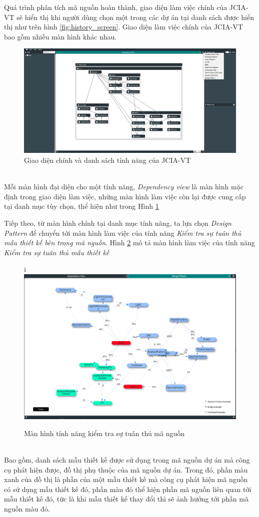 \documentclass[12pt]{report}
\begin{document}
Quá trình phân tích mã nguồn hoàn thành, giao diện làm việc chính của JCIA-VT sẽ hiển thị khi người dùng chọn một trong các dự án tại danh sách được hiển thị như trên hình \ref{fig:history_screen}. Giao diện làm việc chính của JCIA-VT bao gồm nhiều màn hình khác nhau.
\begin{figure}[h]
	\centering
	\includegraphics[scale=0.25]{images/main_screen}
	\caption{Giao diện chính và danh sách tính năng của JCIA-VT}
	\label{fig:main_screen}
\end{figure}\\
Mỗi màn hình đại diện cho một tính năng, \textit{Dependency view} là màn hình mặc định trong giao diện làm việc, những màn hình làm việc còn lại được cung cấp tại danh mục tùy chọn, thể hiện như trong Hình \ref{fig:main_screen}

\noindent Tiếp theo, từ màn hình chính tại danh mục tính năng, ta lựa chọn \textit{Design Pattern} để chuyển tới màn hình làm việc của tính năng \textit{Kiểm tra sự tuân thủ mẫu thiết kế bên trong mã nguồn}. Hình \ref{fig:design_pattern_workspace} mô tả màn hình làm việc của tính năng \textit{Kiểm tra sự tuân thủ mẫu thiết kế}
\begin{figure}[h]i
	\centering
	\includegraphics[scale=0.34]{images/design_pattern_workspace}
	\caption{Màn hình tính năng kiểm tra sự tuân thủ mã nguồn}
	\label{fig:design_pattern_workspace}
\end{figure}\\
Bao gồm, danh sách mẫu thiết kế được sử dụng trong mã nguồn dự án mà công cụ phát hiện được, đồ thị phụ thuộc của mã nguồn dự án. Trong đó, phần màu xanh của đồ thị là phần của một mẫu thiết kế mà công cụ phát hiện mã nguồn có sử dụng mẫu thiết kế đó, phần màu đỏ thể hiện phần mã nguồn liên quan tới mẫu thiết kế đó, tức là khi mẫu thiết kế thay đổi thì sẽ ảnh hưởng tới phần mã nguồn màu đỏ.
\newpage
\end{document}
